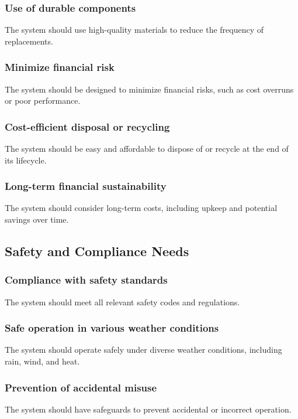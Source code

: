 \documentclass[11pt]{article}
\begin{document}
\subsubsection{Use of durable components}
The system should use high-quality materials to reduce the frequency of replacements.

\subsubsection{Minimize financial risk}
The system should be designed to minimize financial risks, such as cost overruns or poor performance.

\subsubsection{Cost-efficient disposal or recycling}
The system should be easy and affordable to dispose of or recycle at the end of its lifecycle.

\subsubsection{Long-term financial sustainability}
The system should consider long-term costs, including upkeep and potential savings over time.

\newpage
\subsection{Safety and Compliance Needs}

\subsubsection{Compliance with safety standards}
The system should meet all relevant safety codes and regulations.

\subsubsection{Safe operation in various weather conditions}
The system should operate safely under diverse weather conditions, including rain, wind, and heat.

\subsubsection{Prevention of accidental misuse}
The system should have safeguards to prevent accidental or incorrect operation.
\end{document}
